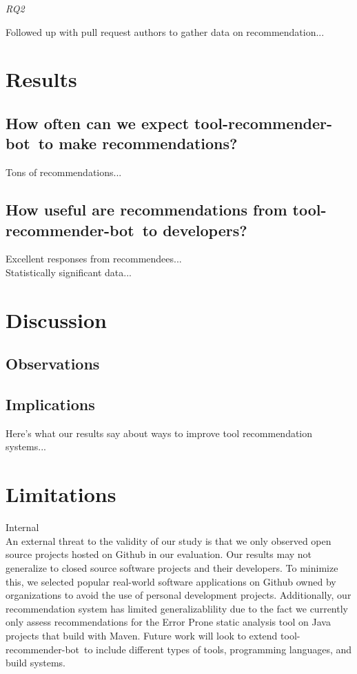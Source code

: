 \documentclass[conference]{IEEEtran}
\newcommand{\tool}{tool-recommender-bot}
\newcommand{\pseudosubsection}[1]{\vspace{2mm} {\it #1}}
\begin{document}
\pseudosubsection{RQ2}

Followed up with pull request authors to gather data on recommendation...

\section{Results}

\subsection{How often can we expect \tool~to make recommendations?}

Tons of recommendations... \\

\subsection{How useful are recommendations from \tool~to developers?}

Excellent responses from recommendees...\\

Statistically significant data...

\section{Discussion}

\subsection{Observations}

\subsection{Implications}

Here's what our results say about ways to improve tool recommendation systems...

\section{Limitations}

Internal\\

An external threat to the validity of our study is that we only observed open source projects hosted on Github in our evaluation. Our results may not generalize to closed source software projects and their developers. To minimize this, we selected popular real-world software applications on Github owned by organizations to avoid the use of personal development projects. Additionally, our recommendation system has limited generalizablility due to the fact we currently only assess recommendations for the Error Prone static analysis tool on Java projects that build with Maven. Future work will look to extend \tool~to include different types of tools, programming languages, and build systems.
\end{document}
